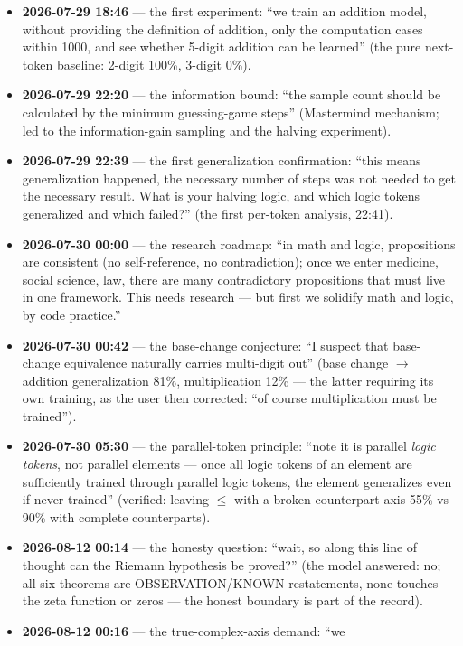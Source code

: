 \documentclass[sigplan,10pt,anonymous,review]{acmart}
\begin{document}
\begin{itemize}
\item \textbf{2026-07-29 18:46} --- the first experiment: ``we train an
addition model, without providing the definition of addition, only the
computation cases within 1000, and see whether 5-digit addition can be
learned'' (the pure next-token baseline: 2-digit 100\%, 3-digit 0\%).
\item \textbf{2026-07-29 22:20} --- the information bound: ``the sample
count should be calculated by the minimum guessing-game steps'' (Mastermind
mechanism; led to the information-gain sampling and the halving
experiment).
\item \textbf{2026-07-29 22:39} --- the first generalization confirmation:
``this means generalization happened, the necessary number of steps was not
needed to get the necessary result. What is your halving logic, and which
logic tokens generalized and which failed?'' (the first per-token
analysis, 22:41).
\item \textbf{2026-07-30 00:00} --- the research roadmap: ``in math and
logic, propositions are consistent (no self-reference, no contradiction);
once we enter medicine, social science, law, there are many contradictory
propositions that must live in one framework. This needs research --- but
first we solidify math and logic, by code practice.''
\item \textbf{2026-07-30 00:42} --- the base-change conjecture: ``I suspect
that base-change equivalence naturally carries multi-digit out'' (base
change $\to$ addition generalization 81\%, multiplication 12\% --- the
latter requiring its own training, as the user then corrected: ``of course
multiplication must be trained'').
\item \textbf{2026-07-30 05:30} --- the parallel-token principle: ``note it
is parallel \emph{logic tokens}, not parallel elements --- once all logic
tokens of an element are sufficiently trained through parallel logic
tokens, the element generalizes even if never trained'' (verified: leaving
$\le$ with a broken counterpart axis 55\% vs 90\% with complete
counterparts).
\item \textbf{2026-08-12 00:14} --- the honesty question: ``wait, so along
this line of thought can the Riemann hypothesis be proved?'' (the model
answered: no; all six theorems are OBSERVATION/KNOWN restatements, none
touches the zeta function or zeros --- the honest boundary is part of the
record).
\item \textbf{2026-08-12 00:16} --- the true-complex-axis demand: ``we

\end{itemize}
\end{document}
